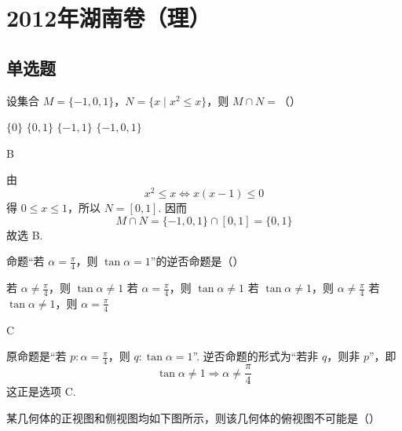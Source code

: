 \chapter{2012年湖南卷（理）}

\section{单选题}

\begin{problem}
设集合 \(M=\{-1,0,1\}\)，\(N=\{x\mid x^2\leqslant x\}\)，则 \(M\cap N=\)（\quad）

\choices
    {\(\{0\}\)}
    {\(\{0,1\}\)}
    {\(\{-1,1\}\)}
    {\(\{-1,0,1\}\)}
\end{problem}

\begin{answer}
B
\end{answer}

\begin{solution}
由
\[
x^2\leqslant x\iff x(x-1)\leqslant0
\]
得 \(0\leqslant x\leqslant1\)，所以 \(N=[0,1]\). 因而
\[
M\cap N=\{-1,0,1\}\cap[0,1]=\{0,1\}
\]
故选 B.
\end{solution}

\begin{problem}
命题“若 \(\alpha=\frac{\pi}{4}\)，则 \(\tan\alpha=1\)”的逆否命题是（\quad）

\choices
    {若 \(\alpha\neq\frac{\pi}{4}\)，则 \(\tan\alpha\neq1\)}
    {若 \(\alpha=\frac{\pi}{4}\)，则 \(\tan\alpha\neq1\)}
    {若 \(\tan\alpha\neq1\)，则 \(\alpha\neq\frac{\pi}{4}\)}
    {若 \(\tan\alpha\neq1\)，则 \(\alpha=\frac{\pi}{4}\)}
\end{problem}

\begin{answer}
C
\end{answer}

\begin{solution}
原命题是“若 \(p:\alpha=\frac{\pi}{4}\)，则 \(q:\tan\alpha=1\)”. 逆否命题的形式为“若非 \(q\)，则非 \(p\)”，即
\[
\tan\alpha\neq1\Longrightarrow\alpha\neq\frac{\pi}{4}
\]
这正是选项 C.
\end{solution}

\begin{problem}
某几何体的正视图和侧视图均如下图所示，则该几何体的俯视图不可能是（\quad）


    {}
    {}
    {}
\end{problem}

